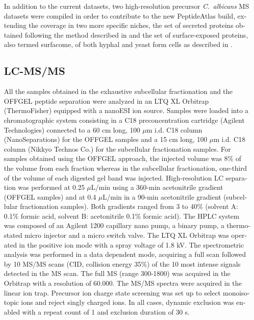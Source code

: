 \begin{otherlanguage}{british}
In addition to the current datasets, two high-resolution precursor \textit{\mbox{C. albicans}} MS datasets
were compiled in order to contribute to the new PeptideAtlas build, extending the coverage in
two more specific niches, the set of secreted proteins obtained following the method
described in \citep{Gil-Bona2015a} and the set of surface-exposed proteins, also termed surfacome, of both
hyphal and yeast form cells as described in \citep{Gil-Bona2015}.


\subsection*{LC-MS/MS}

All the samples obtained in the exhaustive subcellular fractionation and the OFFGEL peptide
separation were analyzed in an LTQ XL Orbitrap (ThermoFisher) equipped with a nanoESI
ion source. Samples were loaded into a chromatographic system consisting in a C18
preconcentration cartridge (Agilent Technologies) connected to a 60 cm long, 100 $\mu$m i.d.
C18 column (NanoSeparations) for the OFFGEL samples and a 15 cm long, 100 $\mu$m i.d. C18
column (Nikkyo Technos Co.) for the subcellular fractionation samples.
For samples obtained using the OFFGEL approach, the injected volume was 8\% of the
volume from each fraction whereas in the subcellular fractionation, one-third of the volume of
each digested gel band was injected.
High-resolution LC separation was performed at 0.25 $\mu$L/min using a 360-min acetonitrile
gradient (OFFGEL samples) and at 0.4 $\mu$L/min in a 90-min acetonitrile gradient (subcellular
fractionation samples). Both gradients ranged from 3 to 40\% (solvent A: 0.1\% formic acid,
solvent B: acetonitrile 0.1\% formic acid). The HPLC system was composed of an Agilent
1200 capillary nano pump, a binary pump, a thermostated micro injector and a micro switch
valve. The LTQ XL Orbitrap was operated in the positive ion mode with a spray voltage of 1.8
kV. The spectrometric analysis was performed in a data dependent mode, acquiring a full
scan followed by 10 MS/MS scans (CID, collision energy 35\%) of the 10 most intense signals
detected in the MS scan. The full MS (range 300-1800) was acquired in the Orbitrap with a
resolution of 60.000. The MS/MS spectra were acquired in the linear ion trap. Precursor ion
charge state screening was set up to select monoisotopic ions and reject singly charged
ions. In all cases, dynamic exclusion was enabled with a repeat count of 1 and exclusion
duration of 30 s.



\end{otherlanguage}
